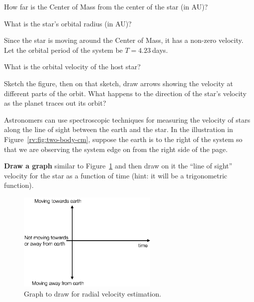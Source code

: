 \begin{steps}
	\item How far is the Center of Mass from the center of the star (in AU)?
	
	\item What is the star’s orbital radius (in AU)?
\end{steps}

Since the star is moving around the Center of Mass, it has a non-zero velocity. Let the orbital period of the system be $T = 4.23\:$days.

\begin{steps}
	\item What is the orbital velocity of the host star?
	
	\item Sketch the figure, then on that sketch, draw arrows showing the velocity at different parts of the orbit. What happens to the direction of the star’s velocity as the planet traces out its orbit?
\end{steps}

Astronomers can use spectroscopic techniques for measuring the velocity of stars along the line of sight between the earth and the star. In the illustration in Figure~\ref{rv:fig:two-body-cm}, suppose the earth is to the right of the system so that we are observing the system edge on from the right side of the page. 

\begin{steps}
	\item \textbf{Draw a graph} similar to Figure~\ref{rv:fig:graph} and then draw on it the ``line of sight'' velocity for the star as a function of time (hint: it will be a trigonometric function).
\end{steps}

\begin{figure}
	\centering
	\includegraphics[width=0.6\textwidth]{radial-velocity/radial-graph}
	\caption{Graph to draw for radial velocity estimation.}\label{rv:fig:graph}
\end{figure}


